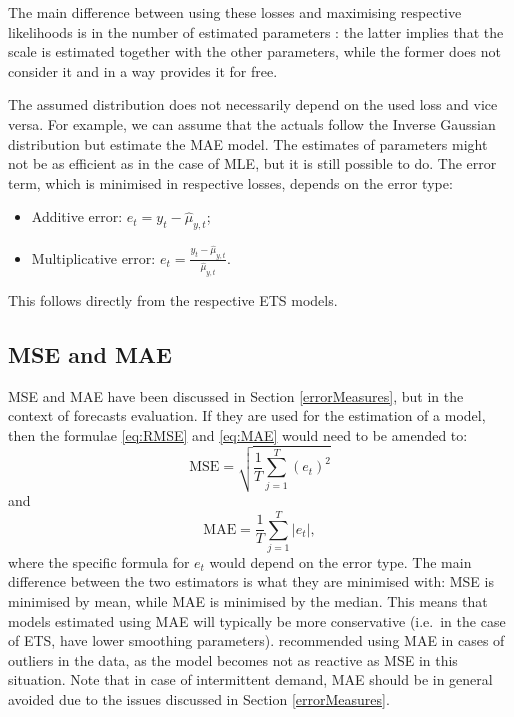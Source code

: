 \documentclass[
]{book}
\providecommand{\tightlist}{%
  \setlength{\itemsep}{0pt}\setlength{\parskip}{0pt}}
\theoremstyle{definition}
\theoremstyle{definition}
\theoremstyle{definition}
\theoremstyle{definition}
\theoremstyle{remark}
\begin{document}
The main difference between using these losses and maximising respective likelihoods is in the number of estimated parameters \citep[see discussion in Section 13.3 of][]{SvetunkovSBA}: the latter implies that the scale is estimated together with the other parameters, while the former does not consider it and in a way provides it for free.

The assumed distribution does not necessarily depend on the used loss and vice versa. For example, we can assume that the actuals follow the Inverse Gaussian distribution but estimate the MAE model. The estimates of parameters might not be as efficient as in the case of MLE, but it is still possible to do. The error term, which is minimised in respective losses, depends on the error type:

\begin{itemize}
\tightlist
\item
  Additive error: \(e_t = y_t -\hat{\mu}_{y,t}\);
\item
  Multiplicative error: \(e_t = \frac{y_t -\hat{\mu}_{y,t}}{\hat{\mu}_{y,t}}\).
\end{itemize}

This follows directly from the respective ETS models.

\hypertarget{MSEandMAEEstimators}{%
\subsection{MSE and MAE}\label{MSEandMAEEstimators}}

MSE and MAE have been discussed in Section \ref{errorMeasures}, but in the context of forecasts evaluation. If they are used for the estimation of a model, then the formulae \eqref{eq:RMSE} and \eqref{eq:MAE} would need to be amended to:
\begin{equation}
    \mathrm{MSE} = \sqrt{\frac{1}{T} \sum_{j=1}^T \left( e_t \right)^2 }
    \label{eq:MSEInSample}
\end{equation}
and
\begin{equation}
    \mathrm{MAE} = \frac{1}{T} \sum_{j=1}^T \left| e_t \right| ,
    \label{eq:MAEInSample}
\end{equation}
where the specific formula for \(e_t\) would depend on the error type. The main difference between the two estimators is what they are minimised with: MSE is minimised by mean, while MAE is minimised by the median. This means that models estimated using MAE will typically be more conservative (i.e.~in the case of ETS, have lower smoothing parameters). \citet{Gardner2006} recommended using MAE in cases of outliers in the data, as the model becomes not as reactive as MSE in this situation. Note that in case of intermittent demand, MAE should be in general avoided due to the issues discussed in Section \ref{errorMeasures}.
\end{document}
